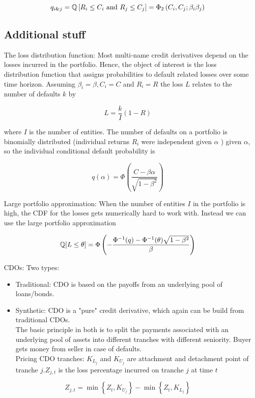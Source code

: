 $$
q_{i \& j}=\mathbb{Q}\left[R_{i} \leq C_{i} \text { and } R_{j} \leq C_{j}\right]=\Phi_{2}\left(C_{i}, C_{j} ; \beta_{i} \beta_{j}\right)
$$

\subsection{Additional stuff}
The loss distribution function: Most multi-name credit derivatives depend on the losses incurred in the portfolio. Hence, the object of interest is the loss distribution function that assigns probabilities to default related losses over some time horizon. Assuming $\beta_{i}=\beta, C_{i}=C$ and $R_{i}=R$ the loss $L$ relates to the number of defaults $k$ by

$$
L=\frac{k}{I}(1-R)
$$

where $I$ is the number of entities. The number of defaults on a portfolio is binomially distributed (individual returns $R_{i}$ were independent given $\alpha$ ) given $\alpha$, so the individual conditional default probability is

$$
q(\alpha)=\Phi\left(\frac{C-\beta \alpha}{\sqrt{1-\beta^{2}}}\right)
$$

Large portfolio approximation: When the number of entities $I$ in the portfolio is high, the CDF for the losses gets numerically hard to work with. Instead we can use the large portfolio approximation

$$
\mathbb{Q}[L \leq \theta]=\Phi\left(-\frac{\Phi^{-1}(q)-\Phi^{-1}(\theta) \sqrt{1-\beta^{2}}}{\beta}\right)
$$

CDOs: Two types:

\begin{itemize}
  \item Traditional: CDO is based on the payoffs from an underlying pool of loans/bonds.
  \item Synthetic: CDO is a "pure" credit derivative, which again can be build from traditional CDOs.\\
The basic principle in both is to split the payments associated with an underlying pool of assets into different tranches with different seniority. Buyer gets money from seller in case of defaults.\\
Pricing CDO tranches: $K_{L_{j}}$ and $K_{U_{j}}$ are attachment and detachment point of tranche $j . Z_{j, t}$ is the loss percentage incurred on tranche $j$ at time $t$
\end{itemize}

$$
Z_{j, t}=\min \left\{Z_{t}, K_{U_{j}}\right\}-\min \left\{Z_{t}, K_{L_{j}}\right\}
$$

